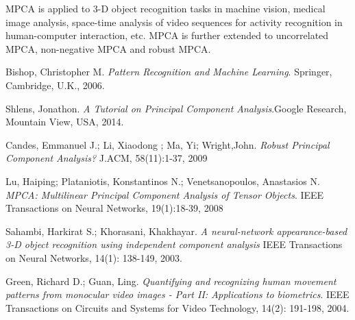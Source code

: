 MPCA is applied to 3-D object recognition tasks \citep{sahambi} in machine vision, medical image analysis, space-time analysis of video sequences for activity recognition \citep{green} in human-computer interaction, etc.  MPCA is further extended to uncorrelated MPCA, non-negative MPCA and robust MPCA.

\begin{thebibliography}{9}

	Bishop, Christopher M.
	\textit{Pattern Recognition
	and Machine Learning}. Springer, Cambridge, U.K., 2006.

	Shlens, Jonathon. \textit{A Tutorial on Principal Component Analysis}.Google Research,
	Mountain View, USA, 2014.

 Candes, Emmanuel J.; Li, Xiaodong ; Ma, Yi; Wright,John. \textit{Robust Principal Component Analysis?} J.ACM, 58(11):1-37, 2009 
 
 Lu, Haiping; Plataniotis, Konstantinos N.; Venetsanopoulos,  
 Anastasios N. 
 \textit{MPCA: Multilinear Principal Component Analysis of Tensor Objects}.  IEEE Transactions on Neural Networks, 19(1):18-39, 2008
 
 Sahambi, Harkirat S.; Khorasani, Khakhayar. \textit{A neural-network appearance-based 3-D object recognition using independent component analysis} IEEE Transactions on Neural Networks, 14(1): 138-149, 2003. 
 
  Green, Richard D.; Guan, Ling. \textit{Quantifying and recognizing human movement patterns from monocular video images - Part II: Applications to biometrics}. IEEE Transactions on Circuits and Systems for Video Technology, 14(2): 191-198, 2004. 
 	
\end{thebibliography}

